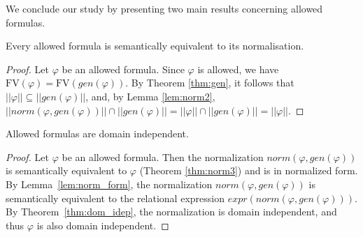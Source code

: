 \documentclass{lmcs}
\def\norm{norm}
\def\expr{expr}
\def\FV{\textrm{FV}}
\def\gen{gen}
\begin{document}
We conclude our study by presenting two main results concerning allowed formulas.

\begin{thm}\label{thm:norm3}
Every allowed formula is semantically equivalent to its normalisation. 
\end{thm}
\begin{proof}
Let $\varphi$ be an allowed formula. Since $\varphi$ is allowed, we have $\FV(\varphi)=\FV(\gen(\varphi))$. By Theorem \ref{thm:gen}, it follows that  $||\varphi||\subseteq||\gen(\varphi)||$, and, by Lemma \ref{lem:norm2}, $||\norm(\varphi,\gen(\varphi))||\cap||\gen(\varphi)||=||\varphi||\cap||\gen(\varphi)||=||\varphi||$.
\end{proof}


\begin{thm}
Allowed formulas are domain independent. 
\end{thm}
\begin{proof}
Let $\varphi$ be an allowed formula. Then the normalization $\norm(\varphi,\gen(\varphi))$ is semantically equivalent to $\varphi$ (Theorem \ref{thm:norm3}) and is in normalized form. By Lemma~\ref{lem:norm_form}, the normalization $\norm(\varphi,\gen(\varphi))$ is semantically equivalent to the relational expression $\expr(\norm(\varphi,\gen(\varphi)))$. By Theorem~\ref{thm:dom_idep}, the normalization is domain independent, and thus $\varphi$ is also domain independent.
\end{proof}




\end{document}

